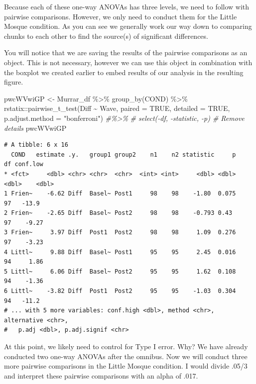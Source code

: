 \documentclass[
  11pt,
]{book}
\newenvironment{Shaded}{\begin{snugshade}}{\end{snugshade}}
\newcommand{\AttributeTok}[1]{\textcolor[rgb]{0.77,0.63,0.00}{#1}}
\newcommand{\CommentTok}[1]{\textcolor[rgb]{0.56,0.35,0.01}{\textit{#1}}}
\newcommand{\ConstantTok}[1]{\textcolor[rgb]{0.00,0.00,0.00}{#1}}
\newcommand{\FunctionTok}[1]{\textcolor[rgb]{0.00,0.00,0.00}{#1}}
\newcommand{\NormalTok}[1]{#1}
\newcommand{\OtherTok}[1]{\textcolor[rgb]{0.56,0.35,0.01}{#1}}
\newcommand{\SpecialCharTok}[1]{\textcolor[rgb]{0.00,0.00,0.00}{#1}}
\newcommand{\StringTok}[1]{\textcolor[rgb]{0.31,0.60,0.02}{#1}}
\begin{document}
Because each of these one-way ANOVAs has three levels, we need to follow with pairwise comparisons. However, we only need to conduct them for the Little Mosque condition. As you can see we generally work our way down to comparing chunks to each other to find the source(s) of significant differences.

You will notice that we are saving the results of the pairwise comparisons as an object. This is not necessary, however we can use this object in combination with the boxplot we created earlier to embed results of our analysis in the resulting figure.

\begin{Shaded}
\begin{Highlighting}[]
\NormalTok{pwcWVwiGP }\OtherTok{\textless{}{-}}\NormalTok{ Murrar\_df }\SpecialCharTok{\%\textgreater{}\%}
    \FunctionTok{group\_by}\NormalTok{(COND) }\SpecialCharTok{\%\textgreater{}\%}
\NormalTok{    rstatix}\SpecialCharTok{::}\FunctionTok{pairwise\_t\_test}\NormalTok{(Diff }\SpecialCharTok{\textasciitilde{}}\NormalTok{ Wave, }\AttributeTok{paired =} \ConstantTok{TRUE}\NormalTok{, }\AttributeTok{detailed =} \ConstantTok{TRUE}\NormalTok{,}
        \AttributeTok{p.adjust.method =} \StringTok{"bonferroni"}\NormalTok{)  }\CommentTok{\#\%\textgreater{}\%}
\CommentTok{\# select({-}df, {-}statistic, {-}p) \# Remove details}
\NormalTok{pwcWVwiGP}
\end{Highlighting}
\end{Shaded}

\begin{verbatim}
# A tibble: 6 x 16
  COND   estimate .y.   group1 group2    n1    n2 statistic     p    df conf.low
* <fct>     <dbl> <chr> <chr>  <chr>  <int> <int>     <dbl> <dbl> <dbl>    <dbl>
1 Frien~    -6.62 Diff  Basel~ Post1     98    98    -1.80  0.075    97   -13.9 
2 Frien~    -2.65 Diff  Basel~ Post2     98    98    -0.793 0.43     97    -9.27
3 Frien~     3.97 Diff  Post1  Post2     98    98     1.09  0.276    97    -3.23
4 Littl~     9.88 Diff  Basel~ Post1     95    95     2.45  0.016    94     1.86
5 Littl~     6.06 Diff  Basel~ Post2     95    95     1.62  0.108    94    -1.36
6 Littl~    -3.82 Diff  Post1  Post2     95    95    -1.03  0.304    94   -11.2 
# ... with 5 more variables: conf.high <dbl>, method <chr>, alternative <chr>,
#   p.adj <dbl>, p.adj.signif <chr>
\end{verbatim}

At this point, we likely need to control for Type I error. Why? We have already conducted two one-way ANOVAs after the omnibus. Now we will conduct three more pairwise comparisons in the Little Mosque condition. I would divide .05/3 and interpret these pairwise comparisons with an alpha of .017.
\end{document}
